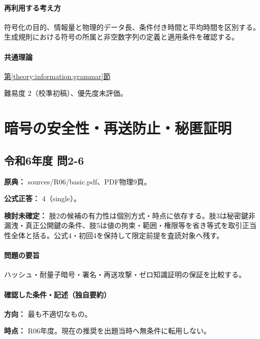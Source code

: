 \paragraph{再利用する考え方} 符号化の目的、情報量と物理的データ長、条件付き時間と平均時間を区別する。生成規則における符号の所属と非空数字列の定義と適用条件を確認する。

\paragraph{共通理論} \hyperref[theory:information:grammar]{第\ref*{theory:information:grammar}節}

\par 難易度 2（校準初稿）、優先度未評価。

\section{暗号の安全性・再送防止・秘匿証明}

\subsection{令和6年度 問2-6}
\label{q:r06-reg-basic-2-6}

\noindent\textbf{原典：} sources/R06/basic.pdf、PDF物理9頁。

\textbf{公式正答：} 4（single）。

\par\textbf{検討未確定：} 肢2の候補の有力性は個別方式・時点に依存する。肢3は秘密鍵非漏洩・真正公開鍵の条件、肢5は値の拘束・範囲・権限等を省き等式を取引正当性全体と括る。公式4・初回4を保持して限定前提を査読対象へ残す。

\paragraph{問題の要旨} ハッシュ・耐量子暗号・署名・再送攻撃・ゼロ知識証明の保証を比較する。

\paragraph{確認した条件・記述（独自要約）}\mbox{}\par

\noindent\textbf{方向：} 最も不適切なもの。\par

\noindent\textbf{時点：} R06年度。現在の推奨を出題当時へ無条件に転用しない。\par

